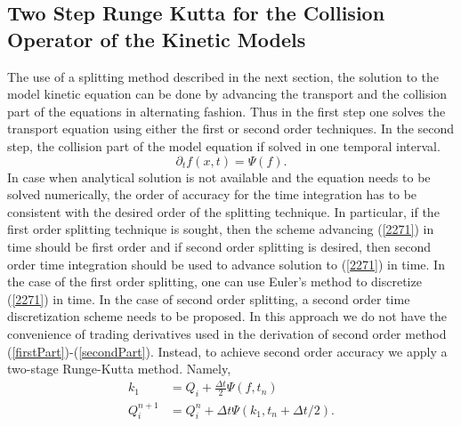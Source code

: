 \subsection{Two Step Runge Kutta for the Collision Operator of the Kinetic Models}
The use of a splitting method described in the next section, the solution to the model kinetic equation can be done by advancing the transport and the collision part of the equations in alternating fashion. Thus in the first step one solves the transport equation using either the first or second order techniques. In the second step, the collision part of the model equation if solved in one temporal interval.
%
\begin{equation}
\label{2271}
\partial_t f(x,t) = \Psi(f).
\end{equation}
%
In case when analytical solution is not available and the equation needs to be solved numerically, the order of accuracy for the time integration has to be consistent with the desired order of the splitting technique. In particular, if the first order splitting technique is sought, then the scheme advancing (\ref{2271}) in time should be first order and if second order splitting is desired, then second order time integration should be used to advance solution to (\ref{2271}) in time. In the case of the first order splitting, one can use Euler's method to discretize (\ref{2271}) in time. In the case of second order splitting, a second order time discretization scheme needs to be proposed. In this approach we do not have the convenience of trading derivatives used in the derivation of second order method (\ref{firstPart})-(\ref{secondPart}). Instead, to achieve second order accuracy we apply a two-stage Runge-Kutta method. Namely,
%
\begin{align*}
k_1 &= Q_i + \frac{\Delta t}{2} \Psi(f,t_n)\\
Q_i^{n+1} &= Q_i^n + \Delta t \Psi(k_1,t_n + \Delta t/2).
\end{align*}
